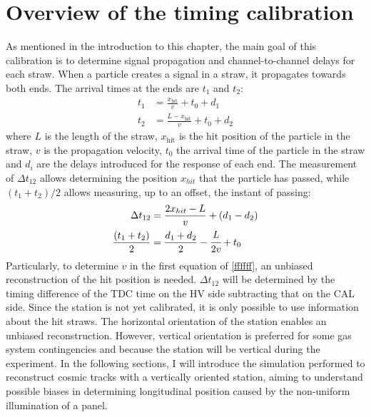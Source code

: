 \section{Overview of the timing calibration}
As mentioned in the introduction to this chapter, the main goal of this calibration is to determine signal propagation and channel-to-channel delays for each straw.
When a particle creates a signal in a straw, it propagates towards both ends. 
The arrival times at the ends are $t_1$ and $t_2$:
\begin{equation}
\begin{aligned}
    t_1 &= \frac{x_{\text{hit}}}{v} + t_0 + d_1 \\
    t_2 &= \frac{L - x_{\text{hit}}}{v} + t_0 + d_2
\end{aligned}
\end{equation}
where $L$ is the length of the straw, $x_{\text{hit}}$ is the hit position 
of the particle in the straw, $v$ is the propagation velocity, $t_0$ the arrival time of the particle in the straw and $d_i$ 
are the delays introduced for the response of each end.
The measurement of $\Delta t_{12}$ allows determining the position $x_{hit}$ that the particle has passed, 
while $(t_1 + t_2) / 2$ allows measuring, up to an offset, the instant of passing:
\begin{equation}\label{ffffff}
    \begin{aligned}
        \Delta t_{12} &= \frac{2x_{hit}-L}{v} +(d_1-d_2)  \\
        \frac{(t_1 + t_2)}{2} &= \frac{d_1+d_2}{2}-\cfrac{L}{2v}+t_0 
    \end{aligned}
    \end{equation}
Particularly, to determine $v$ in the first equation of \ref{ffffff}, an unbiased reconstruction of the hit position is needed.
$\Delta t_{12}$ will be determined by the timing difference of the TDC time on the HV side subtracting that on the CAL side.
Since the station is not yet calibrated, it is only possible to use information about the hit straws. 
The horizontal orientation of the station enables an unbiased reconstruction. 
However, vertical orientation is preferred for some gas system contingencies and because the station will 
be vertical during the experiment. 
In the following sections, I will introduce the simulation performed to reconstruct cosmic tracks with 
a vertically oriented station, aiming to understand possible biases in determining longitudinal position caused by the non-uniform illumination of a panel.
